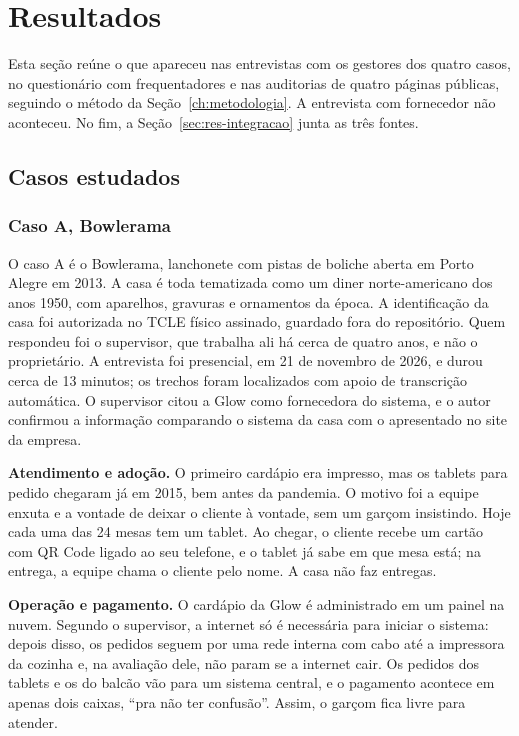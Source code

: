 \chapter{Resultados}
\label{ch:resultados}

Esta seção reúne o que apareceu nas entrevistas com os gestores dos quatro casos, no questionário com frequentadores e nas auditorias de quatro páginas públicas, seguindo o método da Seção~\ref{ch:metodologia}. A entrevista com fornecedor não aconteceu. No fim, a Seção~\ref{sec:res-integracao} junta as três fontes.

\section{Casos estudados}
\label{sec:res-casos}

\subsection{Caso A, Bowlerama}
\label{sec:res-caso-a}

O caso A é o Bowlerama, lanchonete com pistas de boliche aberta em Porto Alegre em 2013. A casa é toda tematizada como um diner norte-americano dos anos 1950, com aparelhos, gravuras e ornamentos da época. A identificação da casa foi autorizada no TCLE físico assinado, guardado fora do repositório. Quem respondeu foi o supervisor, que trabalha ali há cerca de quatro anos, e não o proprietário. A entrevista foi presencial, em 21 de novembro de 2026, e durou cerca de 13 minutos; os trechos foram localizados com apoio de transcrição automática. O supervisor citou a Glow como fornecedora do sistema, e o autor confirmou a informação comparando o sistema da casa com o apresentado no site da empresa.

\textbf{Atendimento e adoção.} O primeiro cardápio era impresso, mas os tablets para pedido chegaram já em 2015, bem antes da pandemia. O motivo foi a equipe enxuta e a vontade de deixar o cliente à vontade, sem um garçom insistindo. Hoje cada uma das 24 mesas tem um tablet. Ao chegar, o cliente recebe um cartão com QR Code ligado ao seu telefone, e o tablet já sabe em que mesa está; na entrega, a equipe chama o cliente pelo nome. A casa não faz entregas.

\textbf{Operação e pagamento.} O cardápio da Glow é administrado em um painel na nuvem. Segundo o supervisor, a internet só é necessária para iniciar o sistema: depois disso, os pedidos seguem por uma rede interna com cabo até a impressora da cozinha e, na avaliação dele, não param se a internet cair. Os pedidos dos tablets e os do balcão vão para um sistema central, e o pagamento acontece em apenas dois caixas, ``pra não ter confusão''. Assim, o garçom fica livre para atender.

